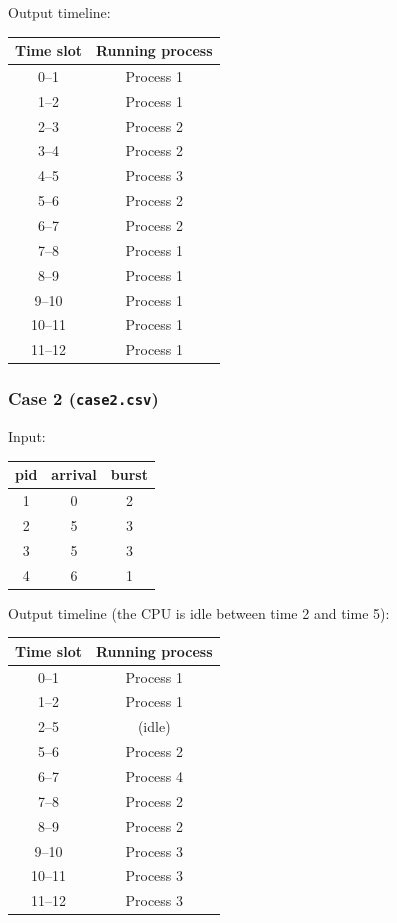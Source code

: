 \documentclass[11pt,a4paper]{article}
\begin{document}
Output timeline:
\begin{center}
\begin{tabular}{cc}
\toprule
Time slot & Running process \\
\midrule
0--1  & Process 1 \\
1--2  & Process 1 \\
2--3  & Process 2 \\
3--4  & Process 2 \\
4--5  & Process 3 \\
5--6  & Process 2 \\
6--7  & Process 2 \\
7--8  & Process 1 \\
8--9  & Process 1 \\
9--10 & Process 1 \\
10--11 & Process 1 \\
11--12 & Process 1 \\
\bottomrule
\end{tabular}
\end{center}

\subsubsection{Case 2 (\texttt{case2.csv})}
Input:
\begin{center}
\begin{tabular}{ccc}
\toprule
pid & arrival & burst \\
\midrule
1 & 0 & 2 \\
2 & 5 & 3 \\
3 & 5 & 3 \\
4 & 6 & 1 \\
\bottomrule
\end{tabular}
\end{center}

Output timeline (the CPU is idle between time 2 and time 5):
\begin{center}
\begin{tabular}{cc}
\toprule
Time slot & Running process \\
\midrule
0--1  & Process 1 \\
1--2  & Process 1 \\
2--5  & (idle) \\
5--6  & Process 2 \\
6--7  & Process 4 \\
7--8  & Process 2 \\
8--9  & Process 2 \\
9--10 & Process 3 \\
10--11 & Process 3 \\
11--12 & Process 3 \\
\bottomrule
\end{tabular}
\end{center}
\end{document}
